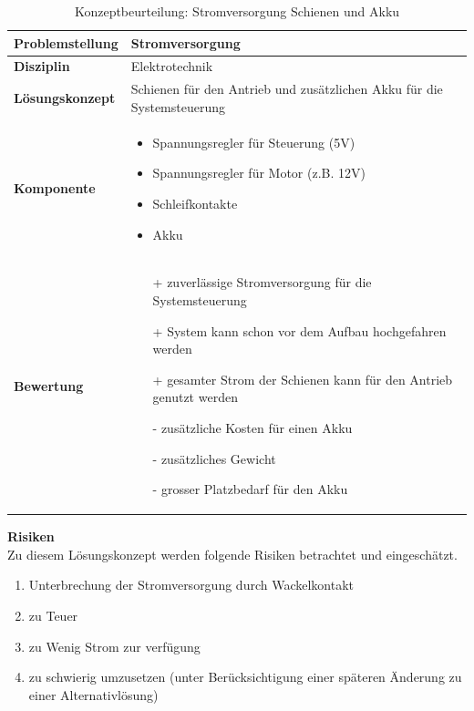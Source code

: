 \documentclass[../../../main.tex]{subfiles}
\begin{document}
    \begin{flushleft}
        \begin{table}[H]
        \begin{tabular}{ | l | p{11cm} |}
        \hline
        \textbf{Problemstellung} & Stromversorgung \\ \hline
        \textbf{Disziplin} & Elektrotechnik \\ \hline
        \textbf{Lösungskonzept} & Schienen für den Antrieb und zusätzlichen Akku für die Systemsteuerung\\ \hline
        \textbf{Komponente} & \begin{itemize}
            \item Spannungsregler für Steuerung (5V)
            \item Spannungsregler für Motor (z.B. 12V)
            \item Schleifkontakte
            \item Akku
            \end{itemize}\\ \hline
        \textbf{Bewertung} &  \begin{itemize}
                                \item[+] zuverlässige Stromversorgung für die Systemsteuerung
                                \item[+] System kann schon vor dem Aufbau hochgefahren werden 
                                \item[+] gesamter Strom der Schienen kann für den Antrieb genutzt werden
                                \item[-] zusätzliche Kosten für einen Akku
                                \item[-] zusätzliches Gewicht
                                \item[-] grosser Platzbedarf für den Akku 
                              \end{itemize} \\ \hline
        \end{tabular}
        \caption{Konzeptbeurteilung: Stromversorgung Schienen und Akku}
        \label{tab:strom_konzept_schienen_und_akku}
    \end{table}
    \end{flushleft}

    \textbf{Risiken}\\
    Zu diesem Lösungskonzept werden folgende Risiken betrachtet und eingeschätzt.
    \begin{enumerate}[I]
        \item Unterbrechung der Stromversorgung durch Wackelkontakt
        \item zu Teuer
        \item zu Wenig Strom zur verfügung
        \item zu schwierig umzusetzen (unter Berücksichtigung einer späteren Änderung zu einer Alternativlösung)
    \end{enumerate}
\end{document}
